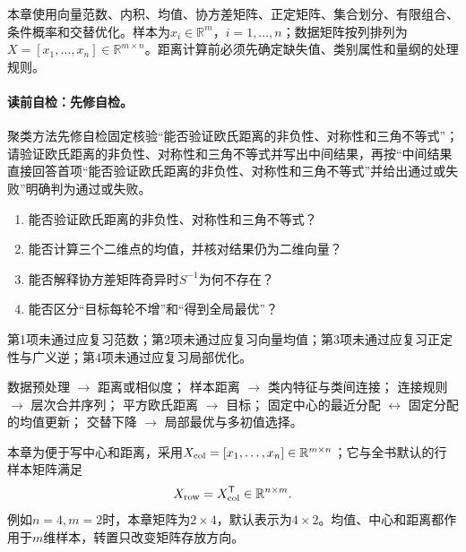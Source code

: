 \begin{prerequisitebox}
本章使用向量范数、内积、均值、协方差矩阵、正定矩阵、集合划分、有限组合、条件概率和交替优化。样本为$x_i\in\mathbb R^m$，$i=1,\ldots,n$；数据矩阵按列排列为$X=[x_1,\ldots,x_n]\in\mathbb R^{m\times n}$。距离计算前必须先确定缺失值、类别属性和量纲的处理规则。
\end{prerequisitebox}

\label{struct:V4-C02-CH03}
\paragraph{读前自检：先修自检。}聚类方法先修自检固定核验“能否验证欧氏距离的非负性、对称性和三角不等式”；请验证欧氏距离的非负性、对称性和三角不等式并写出中间结果，再按“中间结果直接回答首项“能否验证欧氏距离的非负性、对称性和三角不等式”并给出通过或失败”明确判为通过或失败。\par

\begin{precheckbox}
\begin{enumerate}[leftmargin=2.2em]
  \item 能否验证欧氏距离的非负性、对称性和三角不等式？
  \item 能否计算三个二维点的均值，并核对结果仍为二维向量？
  \item 能否解释协方差矩阵奇异时$S^{-1}$为何不存在？
  \item 能否区分“目标每轮不增”和“得到全局最优”？
\end{enumerate}
第1项未通过应复习范数；第2项未通过应复习向量均值；第3项未通过应复习正定性与广义逆；第4项未通过应复习局部优化。
\end{precheckbox}

\label{struct:V4-C02-CH04}
\begin{dependencybox}
数据预处理 $\to$ 距离或相似度；
样本距离 $\to$ 类内特征与类间连接；
连接规则 $\to$ 层次合并序列；
平方欧氏距离 $\to$ \kMeans{}目标；
固定中心的最近分配 $\leftrightarrow$ 固定分配的均值更新；
交替下降 $\to$ 局部最优与多初值选择。
\end{dependencybox}

\begin{keypointbox}[title=数据方向桥：聚类公式采用列样本]
本章为便于写中心和距离，采用$X_{\rm col}=[x_1,\ldots,x_n]\in\mathbb R^{m\times n}$；它与全书默认的行样本矩阵满足
\[
X_{\rm row}=X_{\rm col}^{\mathsf T}\in\mathbb R^{n\times m}.
\]
例如$n=4,m=2$时，本章矩阵为$2\times4$，默认表示为$4\times2$。均值、中心和距离都作用于$m$维样本，转置只改变矩阵存放方向。
\end{keypointbox}

